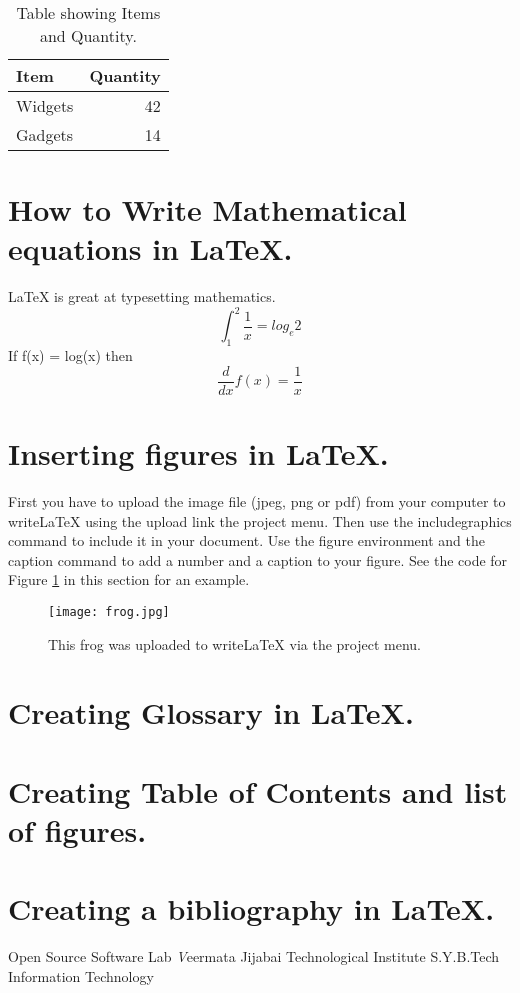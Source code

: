 \documentclass[a4paper]{article}
\begin{document}
\begin{table}
\centering
\begin{tabular}{l|r}
Item & Quantity \\\hline
Widgets & 42 \\
Gadgets & 14
\end{tabular}
\caption{\label{tab:widgets}Table showing Items and Quantity.}
\end{table}


\section{How to Write Mathematical equations in LaTeX.}

\LaTeX{} is great at typesetting mathematics.
\begin{equation}
    \int_1^2\frac{1}{x}=log_e2
\end{equation}
   If f(x) = log(x) then
\begin{equation}
    \frac{d}{dx}f(x) = \frac{1}{x}
\end{equation}

\section{Inserting figures in LaTeX.}

First you have to upload the image file (jpeg, png or pdf) from your computer to writeLaTeX using the upload link the project menu. Then use the includegraphics command to include it in your document. Use the figure environment and the caption command to add a number and a caption to your figure. See the code for Figure \ref{fig:frog} in this section for an example.

\begin{figure}
\centering
\texttt{[image: frog.jpg]}
\caption{\label{fig:frog}This frog was uploaded to writeLaTeX via the project menu.}
\end{figure}

\section{Creating Glossary in LaTeX.}

\section{Creating Table of Contents and list of figures.}

\section{Creating a bibliography in LaTeX.}

\begin{bibliography}{9}
Open Source Software Lab \newline
\emph Veermata Jijabai Technological Institute \newline
S.Y.B.Tech Information Technology

\end{bibliography}
\end{document}
